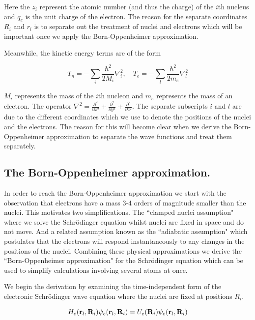 Here the $z_i$ represent the atomic number (and thus the charge) of the $i$th nucleus and $q_e$ is the unit charge of the electron. The reason for the separate coordinates $R_i$ and $r_l$ is to separate out the treatment of nuclei and electrons which will be important once we apply the Born-Oppenheimer approximation.

Meanwhile, the kinetic energy terms are of the form 

\begin {equation}
T_n = - \sum_i \frac{\hbar^2}{2M_i} \nabla_i ^2,\quad  T_e = - \sum_l \frac{\hbar^2}{2m_e} \nabla_l ^2
\end {equation}

$M_i$ represents the mass of the $i$th nucleon and $m_e$ represents the mass of an electron. The operator $\nabla^2 = \frac{\partial^2}{\partial x^2} + \frac{\partial^2 }{\partial y^2} + \frac{\partial^2}{\partial z^2} $. The separate subscripts $i$ and $l$ are due to the different coordinates which we use to denote the positions of the nuclei and the electrons. The reason for this will become clear when we derive the Born-Oppenheimer approximation to separate the wave functions and treat them separately.

\subsection{The Born-Oppenheimer approximation.}
In order to reach the Born-Oppenheimer approximation we start with the observation that electrons have a mass 3-4 orders of magnitude smaller than the nuclei. This motivates two simplifications. The ``clamped nuclei assumption" where we solve the Schr\"odinger equation whilst nuclei are fixed in space and do not move. And a related assumption known as the ``adiabatic assumption" which postulates that the electrons will respond instantaneously to any changes in the positions of the nuclei. Combining these physical approximations we derive the ``Born-Oppenheimer approximation" for the Schr\"odinger equation which can be used to simplify calculations involving several atoms at once. 

We begin the derivation by examining the time-independent form of the electronic Schr\"odinger wave equation where the nuclei are fixed at positions $R_i$. 

\begin{equation}
	H_e(\bold{r}_l, \bold{R}_i)  \psi_e (\bold{r}_l,\bold{R}_i)  = U_e(\bold{R}_i) \psi_e (\bold{r}_l,\bold{R}_i) 
\end{equation}


